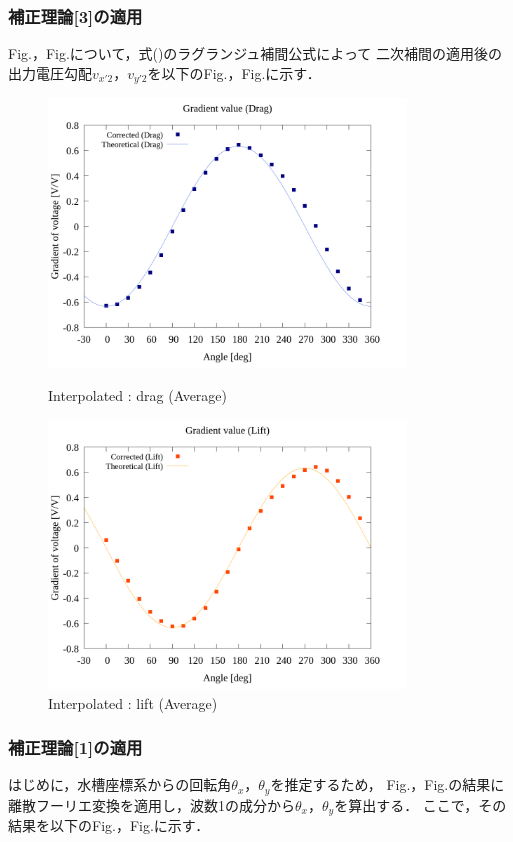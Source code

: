 \subsubsection{補正理論[3]の適用}
Fig.，Fig.について，式()のラグランジュ補間公式によって
二次補間の適用後の出力電圧勾配$v_{x'2}$，$v_{y'2}$を以下のFig.，Fig.に示す．

\begin{figure}[htbp]
		\centering
		\includegraphics[width=95mm]{../../02_workspace/result/2-ex/plot/21/21-3_interpolated_drag.png}
		\caption{Interpolated : drag (Average)}
		\includegraphics[width=95mm]{../../02_workspace/result/2-ex/plot/21/21-3_interpolated_lift.png}
		\caption{Interpolated : lift (Average)}
\end{figure}

\newpage

\subsubsection{補正理論[1]の適用}
はじめに，水槽座標系からの回転角$\theta_x$，$\theta_y$を推定するため，
Fig.，Fig.の結果に離散フーリエ変換を適用し，波数1の成分から$\theta_x$，$\theta_y$を算出する．
ここで，その結果を以下のFig.，Fig.に示す．

